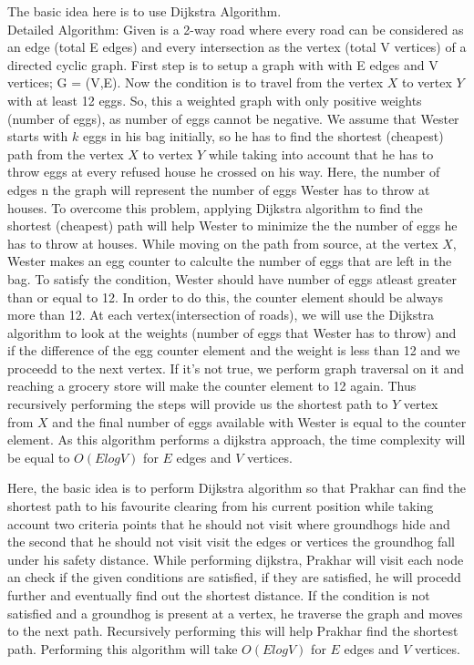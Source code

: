 \documentclass[12pt,twoside]{article}
\begin{document}
\begin{problems}
\begin{problemparts}
\problempart %
The basic idea here is to use Dijkstra Algorithm.\\
Detailed Algorithm: 
Given is a 2-way road where every road can be considered as an edge (total E edges) and every intersection as the vertex (total V vertices) of a directed cyclic graph. First step is to setup a graph with with E edges and V vertices; G = (V,E). Now the condition is to travel from the vertex $X$ to vertex $Y$ with at least 12 eggs. So, this a weighted graph with only positive weights (number of eggs), as number of eggs cannot be negative. We assume that Wester starts with $k$ eggs in his bag initially, so he has to find the shortest (cheapest) path from the vertex $X$ to vertex $Y$ while taking into account that he has to throw eggs at every refused house he crossed on his way. Here, the number of edges n the graph will represent the number of eggs Wester has to throw at houses. To overcome this problem, applying Dijkstra algorithm to find the shortest (cheapest) path will help Wester to minimize the the number of eggs he has to throw at houses. While moving on the path from source, at the vertex $X$, Wester makes an egg counter to calculte the number of eggs that are left in the bag. To satisfy the condition, Wester should have number of eggs atleast greater than or equal to 12. In order to do this, the counter element should be always more than 12. At each vertex(intersection of roads), we will use the Dijkstra algorithm to look at the weights (number of eggs that Wester has to throw) and if the difference of the egg counter element and the weight is less than 12 and we proceedd to the next vertex. If it's not true, we perform graph traversal on it and reaching a grocery store will make the counter element to 12 again. Thus recursively performing the steps will provide us the shortest path to $Y$ vertex from $X$ and the final number of eggs available with Wester is equal to the counter element. As this algorithm performs a dijkstra approach, the time complexity will be equal to $O(ElogV)$ for $E$ edges and $V$ vertices.

\end{problemparts}


\newpage
\problem  %

\begin{problemparts}
\problempart %
Here, the basic idea is to perform Dijkstra algorithm so that Prakhar can find the shortest path to his favourite clearing from his current position while taking account two criteria points that he should not visit where groundhogs hide and the second that he should not visit visit the edges or vertices the groundhog fall under his safety distance. While performing dijkstra, Prakhar will visit each node an check if the given conditions are satisfied, if they are satisfied, he will procedd further and eventually find out the shortest distance. If the condition is not satisfied and a groundhog is present at a vertex, he traverse the graph and moves to the next path. Recursively performing this will help Prakhar find the shortest path. Performing this algorithm will take $O(ElogV)$ for $E$ edges and $V$ vertices.  
 

\end{problemparts}
\end{problems}
\end{document}
